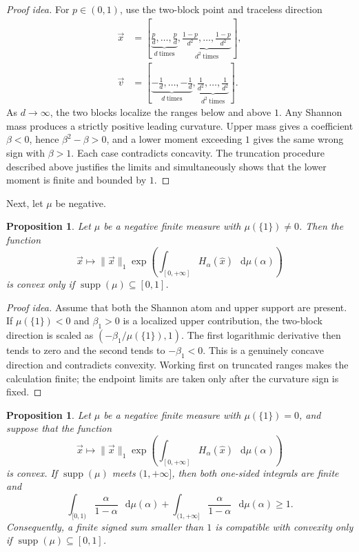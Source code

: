 \documentclass[11pt]{article}
\newtheorem{proposition}[theorem]{Proposition}
\theoremstyle{definition}
\def\d{\mathop{}\!\mathrm{d}}
\begin{document}
\begin{proof}[Proof idea]
For $p\in(0,1)$, use the two-block point and traceless direction
\begin{align}
\vec{x}&=\left[
\underbrace{\frac p d,\ldots,\frac p d}_{d\ \mathrm{times}},
\underbrace{\frac{1-p}{d^2},\ldots,\frac{1-p}{d^2}}_{d^2\ \mathrm{times}}
\right],\\
\vec{v}&=\left[
\underbrace{-\frac1d,\ldots,-\frac1d}_{d\ \mathrm{times}},
\underbrace{\frac1{d^2},\ldots,\frac1{d^2}}_{d^2\ \mathrm{times}}
\right].
\end{align}
As $d\to\infty$, the two blocks localize the ranges below and above $1$.  Any
Shannon mass produces a strictly positive leading curvature.  Upper mass gives a
coefficient $\beta<0$, hence $\beta^2-\beta>0$, and a lower moment exceeding
$1$ gives the same wrong sign with $\beta>1$.  Each case contradicts concavity.
The truncation procedure described above justifies the limits and simultaneously
shows that the lower moment is finite and bounded by $1$.
\end{proof}

Next, let $\mu$ be negative.

\begin{proposition}
\label{prop:no-alpha-one}
Let $\mu$ be a negative finite measure with $\mu(\{1\})\neq0$.  Then the function
\begin{equation}
\vec{x}\longmapsto\|\vec{x}\|_1
\exp\!\left(\int_{[0,+\infty]}H_\alpha(\hat{x})\,
\d\mu(\alpha)\right)
\end{equation}
is convex only if $\operatorname{supp}(\mu)\subseteq[0,1]$.
\end{proposition}

\begin{proof}[Proof idea]
Assume that both the Shannon atom and upper support are present.  If
$\mu(\{1\})<0$ and $\beta_1>0$ is a localized upper contribution, the
two-block direction is scaled as $(-\beta_1/\mu(\{1\}),1)$.  The first
logarithmic derivative then tends to zero and the second tends to
$-\beta_1<0$.  This is a
genuinely concave direction and contradicts convexity.  Working first on
truncated ranges makes the calculation finite; the endpoint limits are taken only
after the curvature sign is fixed.
\end{proof}

\begin{proposition}
\label{prop:second-measure}
Let $\mu$ be a negative finite measure with $\mu(\{1\})=0$, and suppose that the
function
\begin{equation}
\vec{x}\longmapsto\|\vec{x}\|_1
\exp\!\left(\int_{[0,+\infty]}H_\alpha(\hat{x})\,
\d\mu(\alpha)\right)
\end{equation}
is convex.  If $\operatorname{supp}(\mu)$ meets $(1,+\infty]$, then both
one-sided integrals are finite and
\begin{equation}
\label{eq:negative-moment-necessary}
\int_{[0,1)}\frac{\alpha}{1-\alpha}\,\d\mu(\alpha)
+\int_{(1,+\infty]}\frac{\alpha}{1-\alpha}\,\d\mu(\alpha)\geq1.
\end{equation}
Consequently, a finite signed sum smaller than $1$ is compatible with convexity
only if $\operatorname{supp}(\mu)\subseteq[0,1]$.
\end{proposition}
\end{document}
